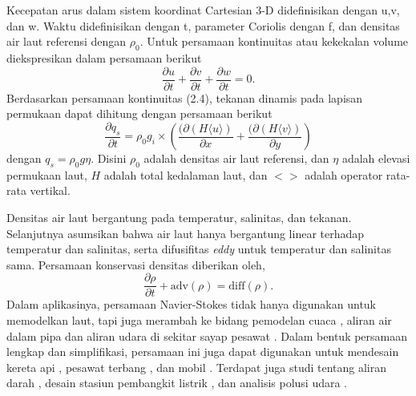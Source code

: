 \begin{spacing}{1.5}
	\par Kecepatan arus dalam sistem koordinat Cartesian 3-D didefinisikan dengan u,v, dan w. Waktu didefinisikan dengan t, parameter Coriolis dengan f, dan densitas air laut referensi dengan $\rho_0$.
	Untuk persamaan kontinuitas atau kekekalan volume diekspresikan dalam persamaan berikut
	\begin{equation}
		\frac{\partial u}{\partial t} + \frac{\partial v}{\partial t} + \frac{\partial w}{\partial t} = 0.
	\end{equation}
	Berdasarkan persamaan kontinuitas (2.4), tekanan dinamis pada lapisan permukaan dapat dihitung dengan persamaan berikut
	\begin{equation}
		\frac{\partial q_s}{\partial t} = \rho_0 g_i \times \left( \frac{(\partial \left(H \langle u \rangle \right)} {\partial x} + \frac{(\partial \left(H \langle v \rangle \right)} {\partial y}\right)
	\end{equation}
	dengan $q_s = \rho_0 g \eta$. Disini $\rho_0$ adalah densitas air laut referensi, dan $\eta$ adalah elevasi permukaan laut, $H$ adalah total kedalaman laut, dan $< >$ adalah operator rata-rata vertikal.
	\par Densitas air laut bergantung pada temperatur, salinitas, dan tekanan. Selanjutnya asumsikan bahwa air laut hanya bergantung linear terhadap temperatur dan salinitas, serta difusifitas \textit{eddy} untuk temperatur dan salinitas sama. Persamaan konservasi densitas diberikan oleh,
	\begin{equation}
		\frac{\partial \rho}{\partial t} + \text{adv}(\rho) = \text{diff}(\rho).
	\end{equation}
	Dalam aplikasinya, persamaan Navier-Stokes tidak hanya digunakan untuk memodelkan laut, tapi juga merambah ke bidang pemodelan cuaca , aliran air dalam pipa  dan aliran udara di sekitar sayap pesawat . Dalam bentuk persamaan lengkap dan simplifikasi, persamaan ini juga dapat digunakan untuk mendesain kereta api , pesawat terbang , dan mobil . Terdapat juga studi tentang aliran darah , desain stasiun pembangkit listrik , dan analisis polusi udara . 
\end{spacing}
\vspace{-0.1pc}
